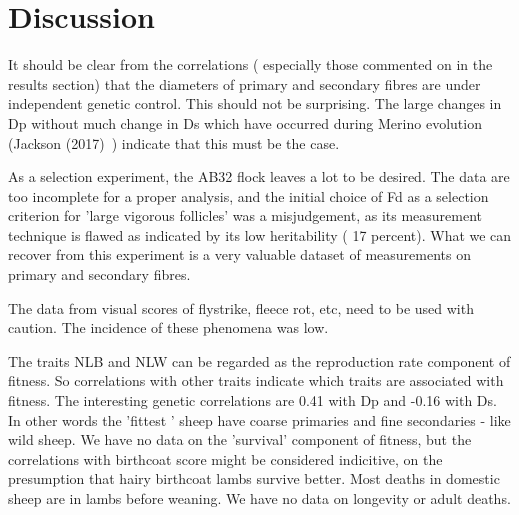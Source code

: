 \documentclass[titlepage]{article}  %
\begin{document}
\section{Discussion}
It should be clear from the correlations ( especially those commented on in the results section) that the diameters of primary and secondary fibres are under independent genetic control. This should not be surprising. The large changes in Dp without much change in Ds which have occurred during Merino evolution (Jackson (2017)~\cite{jack:17}) indicate that this must be the case.

As a selection experiment, the AB32 flock leaves a lot to be desired. The data are too incomplete for a proper analysis, and the initial choice of Fd as a selection criterion for 'large vigorous follicles' was a misjudgement, as its measurement technique is flawed as indicated by its low heritability ( 17 percent). What we can recover from this experiment is a very valuable dataset of measurements on primary and secondary fibres.

The data from visual scores of flystrike, fleece rot, etc, need to be used with caution. The incidence of these phenomena was low. 

The traits NLB and NLW can be regarded as the reproduction rate component of fitness. So correlations with other traits indicate which traits are associated with fitness. The interesting  genetic correlations are 0.41 with Dp and -0.16 with Ds. In other words the 'fittest ' sheep have coarse primaries and fine secondaries - like wild sheep. We have no data on the 'survival' component of fitness, but the correlations with birthcoat score might be considered indicitive, on the presumption that hairy birthcoat lambs survive better. Most deaths in domestic sheep are in lambs before weaning. We have no data on longevity or adult deaths.
\end{document}
